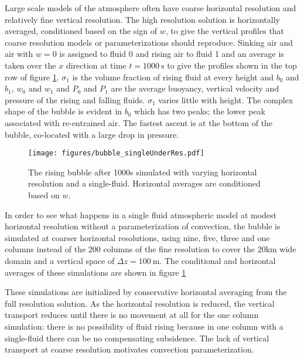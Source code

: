\documentclass[draft]{agujournal2019}
\begin{document}
Large scale models of the atmosphere often have coarse horizontal resolution and relatively fine vertical resolution. The high resolution solution is horizontally averaged, conditioned based on the sign of $w$, to give the vertical profiles that coarse resolution models or parameterizations should reproduce. Sinking air and air with $w=0$ is assigned to fluid 0 and rising air to fluid 1 and an average is taken over the $x$ direction at time $t=1000\ \text{s}$ to give the profiles
shown in the top row of figure \ref{fig:bubble_singleUnderRes}.
$\sigma_{1}$ is the volume fraction of rising fluid at every height and $b_{0}$ and $b_{1}$, $w_{0}$ and $w_{1}$ and $P_{0}$ and $P_{1}$
are the average buoyancy, vertical velocity and pressure of the rising and falling fluids. 
$\sigma_1$ varies little with height. The complex shape of the bubble is evident in $b_0$ which has two peaks; the lower peak associated with re-entrained air. The fastest ascent is at the bottom of the bubble, co-located with a large drop in pressure. 


\begin{figure}
\noindent \begin{centering}
\texttt{[image: figures/bubble\_singleUnderRes.pdf]}
\par\end{centering}
\caption{The rising bubble after 1000s simulated with varying horizontal resolution
and a single-fluid. Horizontal averages are conditioned based on $w$.
\label{fig:bubble_singleUnderRes}}
\end{figure}

In order to see what happens in a single fluid atmospheric model at modest horizontal resolution without a parameterization of convection, the bubble is simulated at coarser horizontal resolutions, using nine, five, three and one columns instead of the 200 columns of the fine resolution to cover the 20km wide domain and a vertical space of $\Delta z=100\ \text{m}$.
The conditional and horizontal averages of these simulations are shown in figure \ref{fig:bubble_singleUnderRes}

These simulations are initialized by conservative
horizontal averaging from the full resolution solution. As the horizontal
resolution is reduced, the vertical transport reduces until there
is no movement at all for the one column simulation: there is no possibility
of fluid rising because in one column with a single-fluid there can be no compensating subsidence. The lack of vertical transport
at coarse resolution motivates convection parameterization. 
\end{document}
